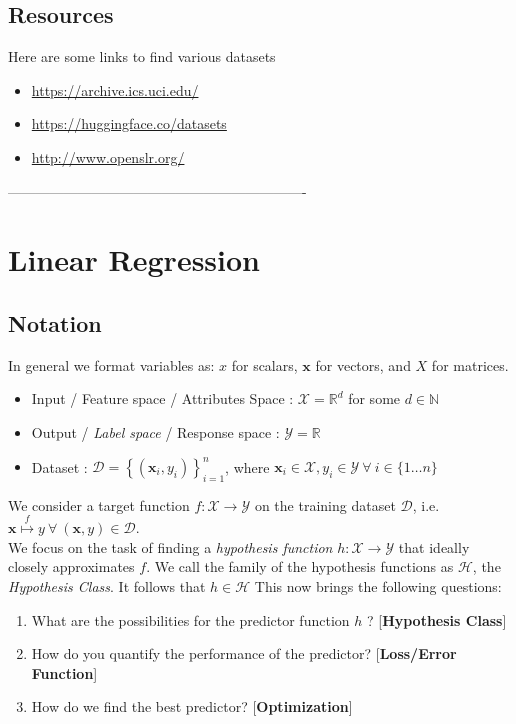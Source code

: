 \documentclass{report}
\newcommand{\x}{\mathbf{x}}
\newcommand{\D}{\mathcal{D}}
\begin{document}
\section{Resources}
Here are some links to find various datasets
\begin{itemize}
  \item \href{https://archive.ics.uci.edu/}{https://archive.ics.uci.edu/}
  \item \href{https://huggingface.co/datasets}{https://huggingface.co/datasets}
  \item \href{http://www.openslr.org/}{http://www.openslr.org/}
\end{itemize}

----------------------------------------------------------------

\chapter{Linear Regression}

\section{Notation}

In general we format variables as: $x$ for scalars, $\x$ for vectors, and $X$ for matrices.
\begin{itemize}
  \item Input / Feature space / Attributes Space :  \( \mathcal{X} =  \mathbb{R}^d\) for some \(d\in\mathbb{N}\)
  \item Output / \emph{Label space} / Response space : \( \mathcal{Y}= \mathbb{R} \)
  \item Dataset : \( \D = \left\{(\textbf{x}_i,y_i)\right\}_{i=1}^{n} \), where \(\textbf{x}_i \in \mathcal{X}, y_i \in \mathcal{Y} \ \forall \ i \in \{1\ldots n\}\)
\end{itemize}

We consider a target function $f : \mathcal{X} \to \mathcal{Y}$ on the training dataset $\D$, i.e. $\textbf{x} \overset{f}{\mapsto} y \ \forall \ (\x,y) \in \D$. \\

We focus on the task of finding a \emph{hypothesis function} \(h : \mathcal{X} \to \mathcal{Y}\) that ideally closely approximates \(f\). We call the family of the hypothesis functions as \(\mathcal{H}\), the \emph{Hypothesis Class}. It follows that \(h \in \mathcal{H}\)
This now brings the following questions:
\begin{enumerate}
  \item What are the possibilities for the predictor function \(h\) ? [\textbf{Hypothesis Class}]
  \item How do you quantify the performance of the predictor? [\textbf{Loss/Error Function}]
  \item How do we find the best predictor? [\textbf{Optimization}]
\end{enumerate}
\end{document}
